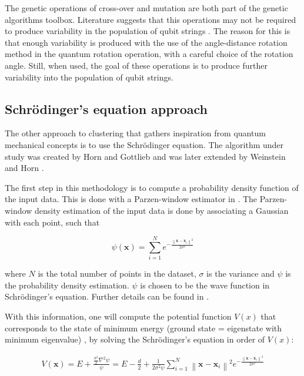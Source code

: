 The genetic operations of cross-over and mutation are both part of the genetic algorithms toolbox.
Literature suggests that this operations may not be required to produce variability in the population of qubit strings \cite{Liu2010}.
The reason for this is that enough variability is produced with the use of the angle-distance rotation method \cite{Liu2010} in the quantum rotation operation, with a careful choice of the rotation angle.
Still, when used, the goal of these operations is to produce further variability into the population of qubit strings.

\subsection{Schrödinger's equation approach} %
\label{sec:horn}

The other approach to clustering that gathers inspiration from quantum mechanical concepts is to use the Schrödinger equation.
The algorithm under study was created by Horn and Gottlieb \cite{Horn2010} and was later extended by Weinstein and Horn \cite{Weinstein2009}.

The first step in this methodology is to compute a probability density function of the input data.
This is done with a Parzen-window estimator in \cite{Horn2001a,Weinstein2009}.
The Parzen-window density estimation of the input data is done by associating a Gaussian with each point, such that

$$ \psi (\mathbf{x}) = \sum ^N _{i=1} e^{- \frac{\left \| \mathbf{x}-\mathbf{x}_i \right \| ^2}{2 \sigma ^2}} $$

where $N$ is the total number of points in the dataset, $\sigma$ is the variance and $\psi$ is the probability density estimation. $\psi$ is chosen to be the wave function in Schrödinger's equation.
Further details can be found in \citet{Weinstein2009,Horn2001a,Horn2001b}.

With this information, one will compute the potential function $V(x)$ that corresponds to the state of minimum energy (ground state = eigenstate with minimum eigenvalue) \cite{Horn2001a}, by solving the Schrödinger's equation in order of $V(x)$:      

\begin{align}
V \left ( \mathbf{x} \right ) = E + \frac {\frac{\sigma^2}{2}\nabla^2 \psi }{\psi}
= E - \frac{d}{2} + \frac {1}{2 \sigma^2 \psi} \sum ^N _{i=1} \left \| \mathbf{x}-\mathbf{x}_i \right \| ^2 e^{- \frac{\left \| \mathbf{x}-\mathbf{x}_i \right \| ^2}{2 \sigma ^2}}
\label{eq:wave}
\end{align}

